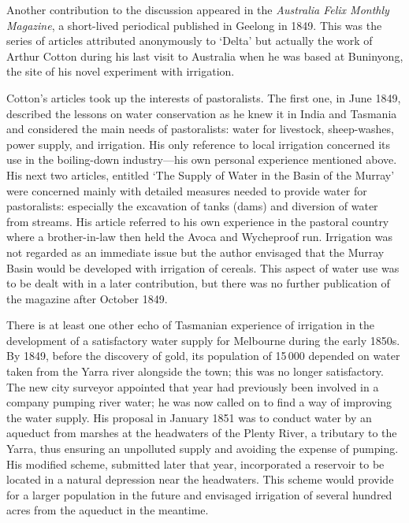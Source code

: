 Another contribution to the discussion appeared in the
\textsl{Australia Felix Monthly Magazine}, a short-lived periodical
published in Geelong in 1849.  This was the series of articles
attributed anonymously to `Delta' but actually the work of Arthur
Cotton during his last visit to Australia when he was based at
Buninyong, the site of his novel experiment with irrigation.

Cotton's articles took up the interests of pastoralists.  The first
one, in June 1849, described the lessons on water conservation as he
knew it in India and Tasmania and considered the main needs of
pastoralists: water for livestock, sheep-washes, power supply, and
irrigation.  His only reference to local irrigation concerned its use
in the boiling-down industry---his own personal experience mentioned
above.  His next two articles, entitled `The Supply of Water in the
Basin of the Murray' were concerned mainly with detailed measures
needed to provide water for pastoralists: especially the excavation of
tanks (dams) and diversion of water from streams.  His article
referred to his own experience in the pastoral country where a
brother-in-law then held the Avoca and Wycheproof run. Irrigation was
not regarded as an immediate issue but the author envisaged that the
Murray Basin would be developed with irrigation of cereals.  This
aspect of water use was to be dealt with in a later contribution, but
there was no further publication of the magazine after October
1849.

There is at least one other echo of Tasmanian experience of irrigation
in the development of a satisfactory water supply for Melbourne during
the early 1850s.  By 1849, before the discovery of gold, its
population of 15\,000 depended on water taken from the Yarra river
alongside the town; this was no longer satisfactory.  The new city
surveyor appointed that year had previously been involved in a company
pumping river water; he was now called on to find a way of improving
the water supply.  His proposal in January 1851 was to conduct water
by an aqueduct from marshes at the headwaters of the Plenty River, a
tributary to the Yarra, thus ensuring an unpolluted supply and
avoiding the expense of pumping.  His modified scheme, submitted later
that year, incorporated a reservoir to be located in a natural
depression near the headwaters.  This scheme would provide for a
larger population in the future and envisaged irrigation of several
hundred acres from the aqueduct in the meantime.


